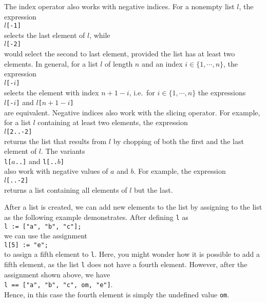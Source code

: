 The index operator also works with negative indices.  For a nonempty list $l$, the expression
\\[0.2cm]
\hspace*{1.3cm}
\texttt{$l$[-1]}
\\[0.2cm]
selects the last element of $l$, while
\\[0.2cm]
\hspace*{1.3cm}
\texttt{$l$[-2]}
\\[0.2cm]
would select the second to last element, provided the list has at least two elements.  In general, for a list $l$ of length $n$ and an index 
$i\in \{1,\cdots,n\}$, the expression
\\[0.2cm]
\hspace*{1.3cm}
\texttt{$l$[-$i$]}
\\[0.2cm]
selects the element with index $n + 1 - i$, i.e.~for $i \in \{1,\cdots,n\}$ the expressions
\\[0.2cm]
\hspace*{1.3cm}
\texttt{$l$[-$i$]} \quad and \quad \texttt{$l$[$n+1-i$]}
\\[0.2cm]
are equivalent.  Negative indices also work with the slicing operator.  For example, for a list $l$
containing at least two elements, the expression
\\[0.2cm]
\hspace*{1.3cm}
\texttt{$l$[2..-2]}
\\[0.2cm]
returns the list that results from $l$ by chopping of both the first and the last element of $l$.
The variants
\\[0.2cm]
\hspace*{1.3cm}
\texttt{l[$a$..]} \quad and \quad \texttt{l[..$b$]}
\\[0.2cm]
also work with negative values of $a$ and $b$.  For example, the expression
\\[0.2cm]
\hspace*{1.3cm}
\texttt{$l$[..-2]}
\\[0.2cm]
returns a list containing all elements of $l$ but the last.

After a list is created, we can add new elements to the list by assigning to the list as the
following example demonstrates.  After defining \texttt{l} as
\\[0.2cm]
\hspace*{1.3cm}
\texttt{l := ["a", "b", "c"];}
\\[0.2cm]
we can use the assignment
\\[0.2cm]
\hspace*{1.3cm}
\texttt{l[5] := "e";}
\\[0.2cm]
to assign a fifth element to \texttt{l}.  Here, you might wonder how it is possible to add a
fifth element, as the list \texttt{l} does not have a fourth element.  However, after the assignment
shown above, we have
\\[0.2cm]
\hspace*{1.3cm}
\texttt{l == ["a", "b", "c", om, "e"]}.
\\[0.2cm]
Hence, in this case the fourth element is simply the undefined value \texttt{om}.

